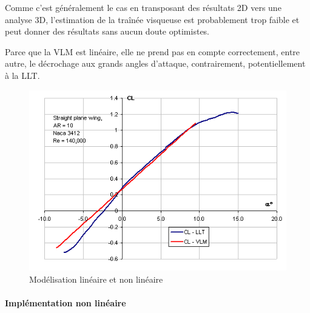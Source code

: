 \documentclass[a4paper,twoside,12pt,dvips]{article}
\begin{document}
Comme c’est généralement le cas en transposant des résultats 2D vers une analyse 3D, l’estimation de la traînée visqueuse est probablement trop faible et peut donner des résultats sans aucun doute optimistes. 

Parce que la VLM est linéaire, elle ne prend pas en compte correctement, entre autre, le décrochage aux grands angles d’attaque, contrairement, potentiellement à la LLT.

\begin{figure}[!ht]
	\centering
	\includegraphics[width=0.8\linewidth]{img-28}
	\caption{Modélisation linéaire et non linéaire}
	\label{img:modélisation_linéaire_non_linéaire}
\end{figure}

\clearpage
\paragraph{Implémentation non linéaire}

\end{document}

